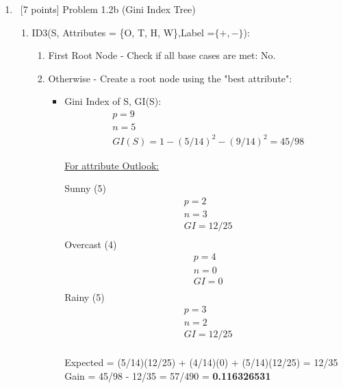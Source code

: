 \documentclass[8pt, fullpage,letterpaper]{article}
\begin{document}
\begin{enumerate}
\begin{enumerate}
\begin{enumerate}
	\end{enumerate}



\color{black}
\item~[7 points] Problem 1.2b (Gini Index Tree)

	\color{violet}
	\begin{enumerate}

	 	\item ID3(S, Attributes = \{O, T, H, W\},Label =$\{+, -\}$): 
			\begin{enumerate}
			\item First Root Node - Check if all base cases are met: {\color{red} No}.
			\item Otherwise - Create a root node using the "best attribute":
				\begin{itemize}
					\item Gini Index of S, GI(S):
						\begin{align*}
						    	& p = 9\\
							& n = 5 \\
						    	& GI(S) = 1 - (5/14)^2 - (9/14)^2 = 45/98
					      \end{align*}

						\underline {For attribute Outlook:} 
							\vspace{-5pt}
							\begin{multicols}{3}
								Sunny (5)
			 						\begin{align*}
									    	& p = 2\\
										& n = 3 \\
									    	& GI = 12/25\\
								      \end{align*}
								Overcast (4)
			 						\begin{align*}
									    	& p = 4\\
										& n = 0 \\
									    	& GI = 0\\
								      \end{align*}
								Rainy (5)
			 						\begin{align*}
									    	& p = 3\\
										& n = 2 \\
									    	& GI = 12/25\\
								      \end{align*}
							\end{multicols}
							\vspace{-20pt}
							Expected = (5/14)(12/25) + (4/14)(0) + (5/14)(12/25) = 12/35\\
							Gain = 45/98 - 12/35 = 57/490 = {\bf 0.116326531}\\


\end{itemize}
\end{enumerate}
\end{enumerate}
\end{enumerate}
\end{enumerate}
\end{document}
